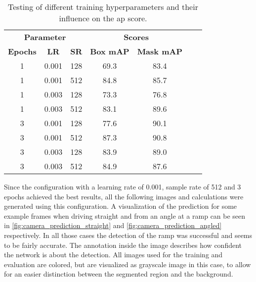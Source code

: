 \begin{table}[htb]
    \centering
    \caption[Detection evaluation]{Testing of different training hyperparameters and their influence on the \acrshort{ap} score.}
    \label{tab:detection_eval}
    \begin{tabular}{ccccccc}
        \toprule
        \multicolumn{3}{c}{\textbf{Parameter} } & \multicolumn{2}{c}{\textbf{Scores} }                                                      \\
        \cmidrule(lr){1-3}                       \cmidrule(lr){4-5}
        \textbf{Epochs}                         & \textbf{LR}                          & \textbf{SR} & \textbf{Box mAP} & \textbf{Mask mAP} \\
        \midrule
        1                                       & 0.001                                & 128         & 69.3             & 83.4              \\
        1                                       & 0.001                                & 512         & 84.8             & 85.7              \\
        1                                       & 0.003                                & 128         & 73.3             & 76.8              \\
        1                                       & 0.003                                & 512         & 83.1             & 89.6              \\
        3                                       & 0.001                                & 128         & 77.6             & 90.1              \\
        3                                       & 0.001                                & 512         & 87.3             & 90.8              \\
        3                                       & 0.003                                & 128         & 83.9             & 89.0              \\
        3                                       & 0.003                                & 512         & 84.9             & 87.6              \\
        \bottomrule
    \end{tabular}
\end{table}
Since the configuration with a learning rate of 0.001, sample rate of 512 and 3 epochs achieved the best results, all the following images and calculations were generated using this configuration.
A visualization of the prediction for some example frames when driving straight and from an angle at a ramp can be seen in \cref{fig:camera_prediction_straight} and \cref{fig:camera_prediction_angled} respectively.
In all those cases the detection of the ramp was successful and seems to be fairly accurate.
The annotation inside the image describes how confident the network is about the detection.
All images used for the training and evaluation are colored, but are visualized as grayscale image in this case, to allow for an easier distinction between the segmented region and the background.

